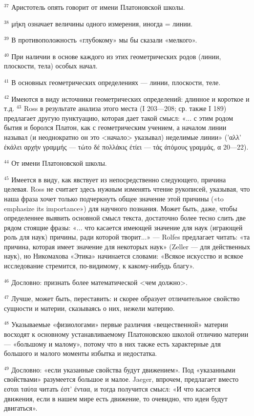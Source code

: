 \documentclass[oneside, 17pt, dvipsnames]{extbook}
\begin{document}
$^{37}$ Аристотель опять говорит от имени Платоновской школы.

$^{38}$ μήκη означает величины одного измерения, иногда = линии.

$^{39}$ В противоположность «глубокому» мы бы сказали «мелкого».

$^{40}$ При наличии в основе каждого из этих геометрических родов (линии, плоскости, тела) особых начал.

$^{41}$ В основных геометрических определениях — линии, плоскости, теле.

$^{42}$ Имеются в виду источники геометрических определений: длинное и короткое и т.д.
$^{43}$ Ross в результате анализа этого места (I 203—208; ср. также I 189) предлагает другую пунктуацию, которая дает такой смысл: «... с этим родом бытия и боролся Платон, как с геометрическим учением, а началом линии называл (и неоднократно он это <начало> указывал) неделимые линии» ('αλλ' έκάλει αρχήν γραμμής — τώτο δέ πολλάκις έτίει — τάς άτόμους γραμμάς, α 20—22).

$^{44}$ От имени Платоновской школы.

$^{45}$ Имеется в виду, как явствует из непосредственно следующего, причина целевая. Ross не считает здесь нужным изменять чтение рукописей, указывая, что наша фраза хочет только подчеркнуть общее значение этой причины («to emphasize its importance») для научного познания. Может быть, даже, чтобы определеннее выявить основной смысл текста, достаточно более тесно слить две рядом стоящие фразы: «... что касается имеющей значение для наук (играющей роль для наук) причины, ради которой творит...» — Rolfes предлагает читать: «та причина, которая имеет значение для некоторых наук» (Zeller — для действенных наук), но Никомахова «Этика» начинается словами: «Всякое искусство и всякое исследование стремится, по-видимому, к какому-нибудь благу».

$^{46}$ Дословно: признать более математической <чем должно>.

$^{47}$ Лучше, может быть, переставить: и скорее образует отличительное свойство сущности и материи, сказываясь о них, нежели материю.

$^{48}$ Указываемые «физиологами» первые различия «вещественной» материи восходят к основному устанавливаемому Платоновскою школой отличию материи — «большому и малому», потому что в них также есть характерные для большого и малого моменты избытка и недостатка.

$^{49}$ Дословно: «если указанные свойства будут движением». Под «указанными свойствами» разумеется большое и малое. Jaeger, впрочем, предлагает вместо εσται ταύτα читать έστ' ένταα, и тогда получится смысл: «И что касается движения, если в нашем мире есть движение, то очевидно, что идеи будут двигаться».
\end{document}
